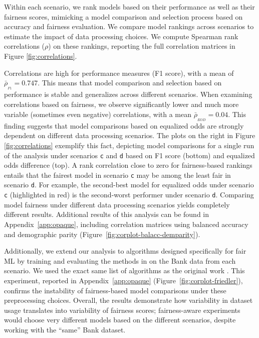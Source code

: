 Within each scenario, we rank models based on their performance as well as their fairness scores, mimicking a model comparison and selection process based on accuracy and fairness evaluation. We compare model rankings across scenarios to estimate the impact of data processing choices. We compute Spearman rank correlations ($\rho$) on these rankings, reporting the full correlation matrices in Figure \ref{fig:correlations}. 

Correlations are high for performance measures (F1 score), with a mean of $\bar{\rho}_{_{F1}} = 0.747$. This means that model comparison and selection based on performance is stable and generalizes across different scenarios.  When examining correlations based on fairness, we observe significantly lower and much more variable (sometimes even negative) correlations, with a mean $\bar{\rho}_{_{EOD}} = 0.04$. This finding suggests that model comparisons based on equalized odds are strongly dependent on different data processing scenarios. The plots on the right in Figure \ref{fig:correlations} exemplify this fact, depicting model comparisons for a single run of the analysis under scenarios \texttt{c} and \texttt{d} based on F1 score (bottom) and equalized odds difference (top). A rank correlation close to zero for fairness-based rankings entails that the fairest model in scenario \texttt{c} may be among the least fair in scenario \texttt{d}. For example, the second-best model for equalized odds under scenario \texttt{c} (highlighted in red) is the second-worst performer under scenario \texttt{d}. Comparing model fairness under different data processing scenarios yields completely different results. Additional results of this analysis can be found in Appendix~\ref{app:opaque}, including correlation matrices using balanced accuracy and demographic parity \citep{calders2009building} (Figure~\ref{fig:corplot-balacc-demparity}).

Additionally, we extend our analysis to algorithms designed specifically for fair ML by training and evaluating the methods in \citet{friedler2019comparative} on the Bank data from each scenario. We used the exact same list of algorithms as the original work \citep{friedler2019comparative,calders2010three,kamishima2012fairness,feldman2015certifying,zafar2017fairness}. This experiment, reported in Appendix~\ref{app:opaque} (Figure~\ref{fig:corplot-friedler}), confirms the instability of fairness-based model comparisons under these preprocessing choices. Overall, the results demonstrate how variability in dataset usage translates into variability of fairness scores; fairness-aware experiments would choose very different models based on the different scenarios, despite working with the ``same'' Bank dataset.

